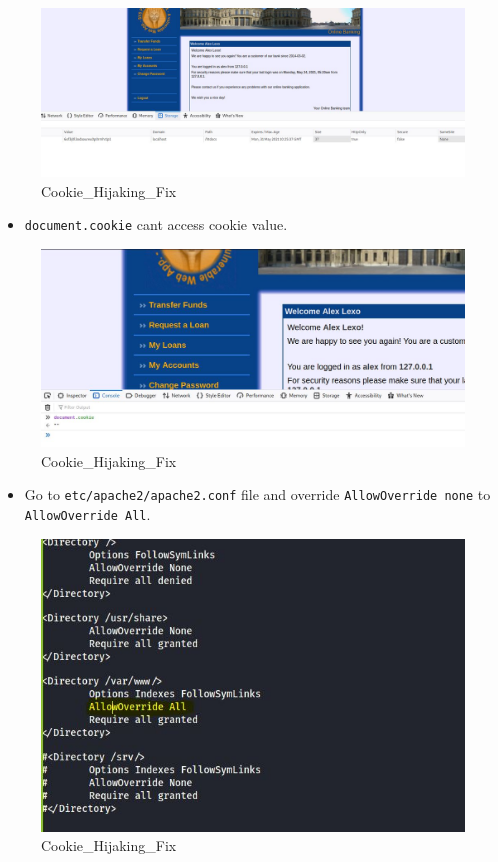 \begin{figure}
\centering
\includegraphics{images/task2/HttpOnly_true.JPG}
\caption{Cookie\_Hijaking\_Fix}
\end{figure}

\begin{itemize}
\tightlist
\item
  \texttt{document.cookie} cant access cookie value.
\end{itemize}

\begin{figure}
\centering
\includegraphics{images/task2/4.5.JPG}
\caption{Cookie\_Hijaking\_Fix}
\end{figure}

\begin{itemize}
\tightlist
\item
  Go to \texttt{etc/apache2/apache2.conf} file and override
  \texttt{AllowOverride\ none} to \texttt{AllowOverride\ All}.
\end{itemize}

\begin{figure}
\centering
\includegraphics{images/task2/SameOrigin_Apacheconf.JPG}
\caption{Cookie\_Hijaking\_Fix}
\end{figure}

